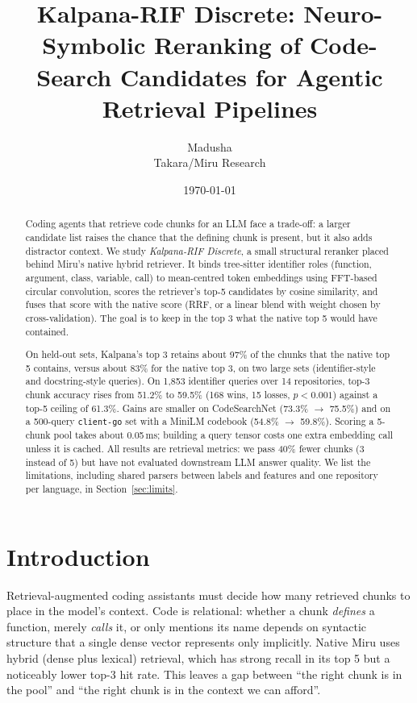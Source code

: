 \documentclass[11pt, a4paper]{article}
\title{\textbf{Kalpana-RIF Discrete: Neuro-Symbolic Reranking of Code-Search Candidates for Agentic Retrieval Pipelines}}
\author{Madusha \\ Takara/Miru Research}
\date{\today}
\begin{document}
\maketitle

\begin{abstract}
Coding agents that retrieve code chunks for an LLM face a trade-off: a larger candidate list raises the chance that the defining chunk is present, but it also adds distractor context. We study \emph{Kalpana-RIF Discrete}, a small structural reranker placed behind Miru's native hybrid retriever. It binds tree-sitter identifier roles (function, argument, class, variable, call) to mean-centred token embeddings using FFT-based circular convolution, scores the retriever's top-5 candidates by cosine similarity, and fuses that score with the native score (RRF, or a linear blend with weight chosen by cross-validation). The goal is to keep in the top 3 what the native top 5 would have contained.

On held-out sets, Kalpana's top 3 retains about 97\% of the chunks that the native top 5 contains, versus about 83\% for the native top 3, on two large sets (identifier-style and docstring-style queries). On 1,853 identifier queries over 14 repositories, top-3 chunk accuracy rises from 51.2\% to 59.5\% (168 wins, 15 losses, $p<0.001$) against a top-5 ceiling of 61.3\%. Gains are smaller on CodeSearchNet (73.3\% $\to$ 75.5\%) and on a 500-query \texttt{client-go} set with a MiniLM codebook (54.8\% $\to$ 59.8\%). Scoring a 5-chunk pool takes about 0.05\,ms; building a query tensor costs one extra embedding call unless it is cached. All results are retrieval metrics: we pass 40\% fewer chunks (3 instead of 5) but have not evaluated downstream LLM answer quality. We list the limitations, including shared parsers between labels and features and one repository per language, in Section~\ref{sec:limits}.
\end{abstract}

\section{Introduction}
Retrieval-augmented coding assistants must decide how many retrieved chunks to place in the model's context. Code is relational: whether a chunk \emph{defines} a function, merely \emph{calls} it, or only mentions its name depends on syntactic structure that a single dense vector represents only implicitly. Native Miru uses hybrid (dense plus lexical) retrieval, which has strong recall in its top 5 but a noticeably lower top-3 hit rate. This leaves a gap between ``the right chunk is in the pool'' and ``the right chunk is in the context we can afford''.
\end{document}
